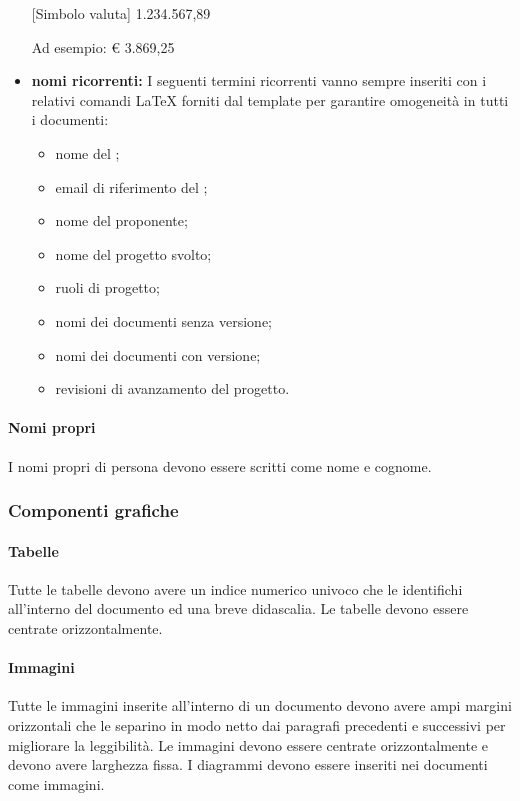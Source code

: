 \begin{itemize}
                    \centerline{[Simbolo valuta] 1.234.567,89}
                    Ad esempio: € 3.869,25
                    \item \textbf{nomi ricorrenti:}
                    I seguenti termini ricorrenti vanno sempre inseriti con i relativi comandi \LaTeX{} forniti dal template per garantire omogeneità in tutti i documenti:
                    \begin{itemize}
                        \item nome del ;
                        \item email di riferimento del ;
                        \item nome del proponente;
                        \item nome del progetto svolto;
                        \item ruoli di progetto;
                        \item nomi dei documenti senza versione;
                        \item nomi dei documenti con versione;
                        \item revisioni di avanzamento del progetto.
                    \end{itemize}
                \end{itemize}
                \paragraph{Nomi propri}
                    I nomi propri di persona devono essere scritti come nome e cognome.
        \subsubsection{Componenti grafiche}
                \paragraph{Tabelle}
                Tutte le tabelle devono avere un indice numerico univoco che le identifichi all'interno del documento ed una breve didascalia. Le tabelle devono essere centrate orizzontalmente.
                \paragraph{Immagini}
                Tutte le immagini inserite all'interno di un documento devono avere ampi margini orizzontali che le separino in modo netto dai paragrafi precedenti e successivi per migliorare la leggibilità. Le immagini devono essere centrate orizzontalmente e devono avere larghezza fissa. I diagrammi  devono essere inseriti nei documenti come immagini.
